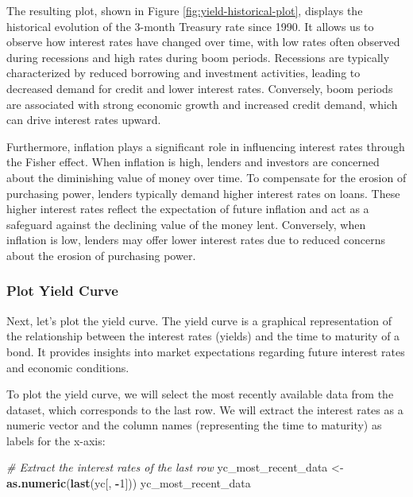 \documentclass[
]{book}
\newenvironment{Shaded}{\begin{snugshade}}{\end{snugshade}}
\newcommand{\CommentTok}[1]{\textcolor[rgb]{0.56,0.35,0.01}{\textit{#1}}}
\newcommand{\DecValTok}[1]{\textcolor[rgb]{0.00,0.00,0.81}{#1}}
\newcommand{\FunctionTok}[1]{\textcolor[rgb]{0.13,0.29,0.53}{\textbf{#1}}}
\newcommand{\NormalTok}[1]{#1}
\newcommand{\OtherTok}[1]{\textcolor[rgb]{0.56,0.35,0.01}{#1}}
\newcommand{\SpecialCharTok}[1]{\textcolor[rgb]{0.81,0.36,0.00}{\textbf{#1}}}
\begin{document}
The resulting plot, shown in Figure \ref{fig:yield-historical-plot}, displays the historical evolution of the 3-month Treasury rate since 1990. It allows us to observe how interest rates have changed over time, with low rates often observed during recessions and high rates during boom periods. Recessions are typically characterized by reduced borrowing and investment activities, leading to decreased demand for credit and lower interest rates. Conversely, boom periods are associated with strong economic growth and increased credit demand, which can drive interest rates upward.

Furthermore, inflation plays a significant role in influencing interest rates through the Fisher effect. When inflation is high, lenders and investors are concerned about the diminishing value of money over time. To compensate for the erosion of purchasing power, lenders typically demand higher interest rates on loans. These higher interest rates reflect the expectation of future inflation and act as a safeguard against the declining value of the money lent. Conversely, when inflation is low, lenders may offer lower interest rates due to reduced concerns about the erosion of purchasing power.

\hypertarget{plot-yield-curve}{%
\subsubsection*{Plot Yield Curve}\label{plot-yield-curve}}

Next, let's plot the yield curve. The yield curve is a graphical representation of the relationship between the interest rates (yields) and the time to maturity of a bond. It provides insights into market expectations regarding future interest rates and economic conditions.

To plot the yield curve, we will select the most recently available data from the dataset, which corresponds to the last row. We will extract the interest rates as a numeric vector and the column names (representing the time to maturity) as labels for the x-axis:

\begin{Shaded}
\begin{Highlighting}[]
\CommentTok{\# Extract the interest rates of the last row}
\NormalTok{yc\_most\_recent\_data }\OtherTok{\textless{}{-}} \FunctionTok{as.numeric}\NormalTok{(}\FunctionTok{last}\NormalTok{(yc[, }\SpecialCharTok{{-}}\DecValTok{1}\NormalTok{]))}
\NormalTok{yc\_most\_recent\_data}
\end{Highlighting}
\end{Shaded}
\end{document}
